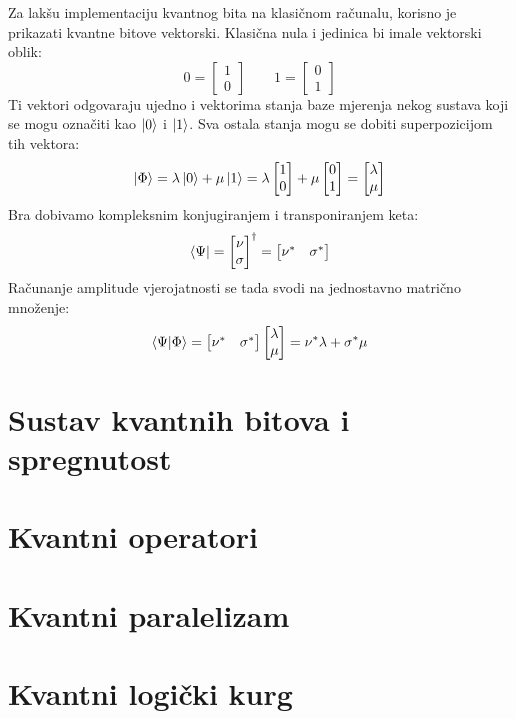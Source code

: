 Za lakšu implementaciju kvantnog bita na klasičnom računalu, korisno je prikazati kvantne bitove vektorski. Klasična nula i jedinica bi imale vektorski oblik:
\[
0 = \begin{bmatrix}
1 \\ 0
\end{bmatrix}
\qquad
1 = \begin{bmatrix}
0 \\ 1
\end{bmatrix}
\]
Ti vektori odgovaraju ujedno i vektorima stanja baze mjerenja nekog sustava koji se mogu označiti kao $\ket{0}$ i $\ket{1}$. Sva ostala stanja mogu se dobiti superpozicijom tih vektora:
\[
\ket{\Phi} = \lambda\ket{0} + \mu\ket{1} = \lambda\begin{bmatrix}
1 \\ 0
\end{bmatrix} + \mu\begin{bmatrix}
0 \\ 1
\end{bmatrix} = \begin{bmatrix}
\lambda \\ \mu
\end{bmatrix}
\]
Bra dobivamo kompleksnim konjugiranjem i transponiranjem keta:
\[
\bra{\Psi} = \begin{bmatrix}
\nu \\ \sigma
\end{bmatrix}^\dagger
= \begin{bmatrix}
\nu^* & \sigma^*
\end{bmatrix}
\]
Računanje amplitude vjerojatnosti se tada svodi na jednostavno matrično množenje:
\[
\braket{\Psi|\Phi} = \begin{bmatrix}
\nu^* & \sigma^*
\end{bmatrix}
\begin{bmatrix}
\lambda \\ \mu
\end{bmatrix} = \nu^*\lambda + \sigma^*\mu
\]















\section{Sustav kvantnih bitova i spregnutost}

\section{Kvantni operatori}

\section{Kvantni paralelizam}

\section{Kvantni logički kurg}